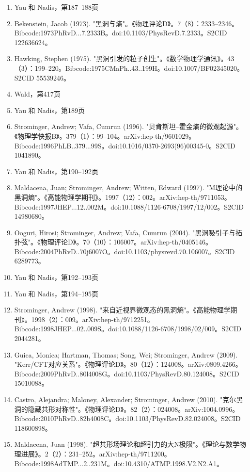 \begin{enumerate}
\item Yau 和 Nadis，第187–188页  
\item Bekenstein, Jacob (1973). "黑洞与熵"。《物理评论D》。7（8）：2333–2346。Bibcode:1973PhRvD...7.2333B。doi:10.1103/PhysRevD.7.2333。S2CID 122636624。  
\item Hawking, Stephen (1975). "黑洞引发的粒子创生"。《数学物理学通讯》。43（3）：199–220。Bibcode:1975CMaPh..43..199H。doi:10.1007/BF02345020。S2CID 55539246。
\item Wald，第417页  
\item Yau 和 Nadis，第189页  
\item Strominger, Andrew; Vafa, Cumrun (1996). "贝肯斯坦–霍金熵的微观起源"。《物理学快报B》。379（1）：99–104。arXiv:hep-th/9601029。Bibcode:1996PhLB..379...99S。doi:10.1016/0370-2693(96)00345-0。S2CID 1041890。  
\item Yau 和 Nadis，第190–192页  
\item Maldacena, Juan; Strominger, Andrew; Witten, Edward (1997). "M理论中的黑洞熵"。《高能物理学期刊》。1997（12）：002。arXiv:hep-th/9711053。Bibcode:1997JHEP...12..002M。doi:10.1088/1126-6708/1997/12/002。S2CID 14980680。  
\item Ooguri, Hirosi; Strominger, Andrew; Vafa, Cumrun (2004). "黑洞吸引子与拓扑弦"。《物理评论D》。70（10）：106007。arXiv:hep-th/0405146。Bibcode:2004PhRvD..70j6007O。doi:10.1103/physrevd.70.106007。S2CID 6289773。  
\item Yau 和 Nadis，第192–193页  
\item Yau 和 Nadis，第194–195页  
\item Strominger, Andrew (1998). "来自近视界微观态的黑洞熵"。《高能物理学期刊》。1998（2）：009。arXiv:hep-th/9712251。Bibcode:1998JHEP...02..009S。doi:10.1088/1126-6708/1998/02/009。S2CID 2044281。  
\item Guica, Monica; Hartman, Thomas; Song, Wei; Strominger, Andrew (2009). "Kerr/CFT对应关系"。《物理评论D》。80（12）：124008。arXiv:0809.4266。Bibcode:2009PhRvD..80l4008G。doi:10.1103/PhysRevD.80.124008。S2CID 15010088。
\item Castro, Alejandra; Maloney, Alexander; Strominger, Andrew (2010). "克尔黑洞的隐藏共形对称性"。《物理评论D》。82（2）：024008。arXiv:1004.0996。Bibcode:2010PhRvD..82b4008C。doi:10.1103/PhysRevD.82.024008。S2CID 118600898。  
\item Maldacena, Juan (1998). "超共形场理论和超引力的大N极限"。《理论与数学物理进展》。2（2）：231–252。arXiv:hep-th/9711200。Bibcode:1998AdTMP...2..231M。doi:10.4310/ATMP.1998.V2.N2.A1。  

\end{enumerate}
